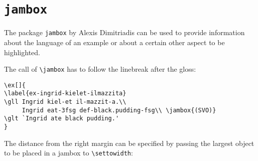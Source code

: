 % 
% 
% 

\section{\texttt{jambox}}
\label{sec-jambox}


The package \texttt{jambox} by Alexis Dimitriadis can be used to provide information about the language of an example or
about a certain other aspect to be highlighted.

\settowidth{}
\eal
{}
\zl

The call of \verb+\jambox+ has to follow the linebreak after the gloss:
\begin{verbatim}
\ex[]{
\label{ex-ingrid-kielet-ilmazzita}
\gll Ingrid kiel-et il-mazzit-a.\\
     Ingrid eat-3fsg def-black.pudding-fsg\\ \jambox{(SVO)}
\glt `Ingrid ate black pudding.'
}
\end{verbatim}
The distance from the right margin can be specified by passing the largest object to be placed in a
jambox to \verb+\settowidth+:

